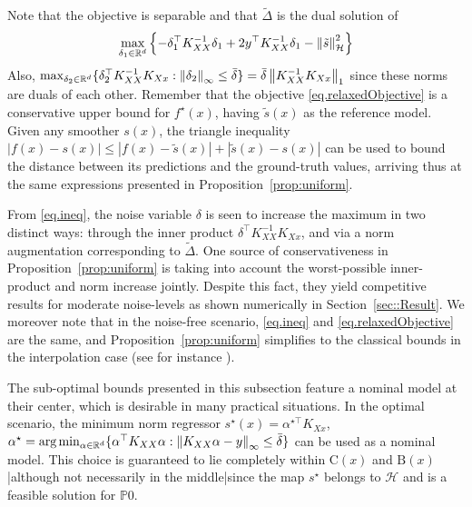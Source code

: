 Note that the objective is separable and that $\tilde\Delta$ is the dual solution of 
\begin{equation}
	\max_{\delta_1 \in \mathbb{R}^d} \left\{ -\delta_1^\top K_{XX}^{-1}\delta_1 + 2y^\top K_{XX}^{-1}\delta_1 - \left\| \tilde s \right\|_\mathcal{H}^2 \right\}
\end{equation}
Also, $\max_{\delta_2 \in \mathbb{R}^d} \{ \delta_2^\top K_{XX}^{-1}K_{Xx} : \left\| \delta_2 \right\|_\infty \leq \bar\delta \} = \bar{\delta} \left\| K_{XX}^{-1}K_{Xx} \right\|_1$ since these norms are duals of each other. Remember that the objective \eqref{eq.relaxedObjective} is a conservative upper bound for $f^\star(x)$, having $\tilde s(x)$ as the reference model. Given any smoother $s(x)$, the triangle inequality $|f(x) - s(x)| \leq |f(x) - \tilde s(x)| + |\tilde s(x) - s(x)|$ can be used to bound the distance between its predictions and the ground-truth values, arriving thus at the same expressions presented in Proposition~\ref{prop:uniform}.

From \eqref{eq.ineq}, the noise variable $\delta$ is seen to increase the maximum in two distinct ways: through the inner product $\delta^\top K_{XX}^{-1}K_{Xx}$, and via a norm augmentation corresponding to $\tilde\Delta$. One source of conservativeness in Proposition~\ref{prop:uniform} is taking into account the worst-possible inner-product and norm increase jointly. Despite this fact, they yield competitive results for moderate noise-levels as shown numerically in Section~\ref{sec::Result}. We moreover note that in the noise-free scenario, \eqref{eq.ineq} and \eqref{eq.relaxedObjective} are the same, and Proposition~\ref{prop:uniform} simplifies to the classical bounds in the interpolation case (see for instance \cite{fasshauer2011positive}).

\begin{remark}
	The sub-optimal bounds presented in this subsection feature a nominal model at their center, which is desirable in many practical situations. In the optimal scenario, the minimum norm regressor $s^\star(x) = \alpha^{\star\top} K_{Xx}$, $\alpha^\star = \text{arg}\min_{\alpha \in \mathbb{R}^d} \{ \alpha^\top K_{XX} \alpha : \left\| K_{XX} \alpha - y \right\|_\infty \leq \bar\delta \}$ can be used as a nominal model. This choice is guaranteed to lie completely within $\text{C}(x)$ and $\text{B}(x)$|although not necessarily in the middle|since the map $s^\star$ belongs to $\mathcal{H}$ and is a feasible solution for $\mathds{P}0$.
\end{remark}